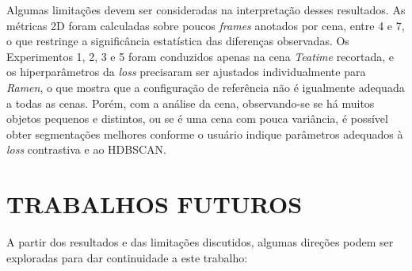 Algumas limitações devem ser consideradas na interpretação desses resultados. As métricas 2D foram calculadas sobre poucos \textit{frames} anotados por cena, entre 4 e 7, o que restringe a significância estatística das diferenças observadas. Os Experimentos 1, 2, 3 e 5 foram conduzidos apenas na cena \textit{Teatime} recortada, e os hiperparâmetros da \emph{loss} precisaram ser ajustados individualmente para \textit{Ramen}, o que mostra que a configuração de referência não é igualmente adequada a todas as cenas. Porém, com a análise da cena, observando-se se há muitos objetos pequenos e distintos, ou se é uma cena com pouca variância, é possível obter segmentações melhores conforme o usuário indique parâmetros adequados à \emph{loss} contrastiva e ao HDBSCAN.


\chapter{TRABALHOS FUTUROS}

A partir dos resultados e das limitações discutidos, algumas direções podem ser exploradas para dar continuidade a este trabalho:

